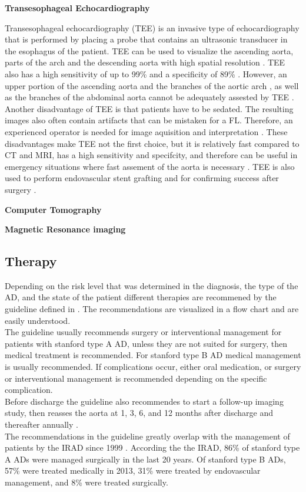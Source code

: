 \documentclass[thesis.tex]{subfiles}
\begin{document}
\textbf{Transesophageal Echocardiography}

Transesophageal echocardiography (TEE) is an invasive type of echocardiography that is performed by placing a probe that contains an ultrasonic transducer in the esophagus of the patient. TEE can be used to visualize the ascending aorta, parts of the arch and the descending aorta with high spatial resolution \cite{baliga2014role}. TEE also has a high sensitivity of up to 99\% and a specificity of 89\% \cite{baliga2014role}. However, an upper portion of the ascending aorta and the branches of the aortic arch \cite{shiga2006diagnostic,baliga2014role}, as well as the branches of the abdominal aorta cannot be adequately assested by TEE \cite{baliga2014role}. Another disadvantage of TEE is that patients have to be sedated. The resulting images also often contain artifacts that can be mistaken for a FL. Therefore, an experienced operator is needed for image aquisition and interpretation \cite{shiga2006diagnostic,baliga2014role}. These disadvantages make TEE not the first choice, but it is relatively fast compared to CT and MRI, has a high sensitivity and specifcity, and therefore can be useful in emergency situations where fast assement of the aorta is necessary \cite{shiga2006diagnostic,baliga2014role}. TEE is also used to perform endovascular stent grafting and for confirming success after surgery \cite{baliga2014role}. 

\textbf{Computer Tomography} 

\textbf{Magnetic Resonance imaging}
\subsection{Therapy} 
Depending on the risk level that was determined in the diagnosis, the type of the AD, and the state of the patient different therapies are recommened by the guideline defined in \cite{hiratzka20102010}. The recommendations are visualized in a flow chart and are easily understood. \\ The guideline usually recommends surgery or interventional management for patients with stanford type A AD, unless they are not suited for surgery, then medical treatment is recommended. For stanford type B AD medical management is usually recommended. If complications occur, either oral medication, or surgery or interventional management is recommended depending on the specific complication. \\ Before discharge the guideline also recommendes to start a follow-up imaging study, then reasses the aorta at 1, 3, 6, and 12 months after discharge and thereafter annually \cite{hiratzka20102010}. \\ The recommendations in the guideline greatly overlap with the management of patients by the IRAD since 1999 \cite{doi:10.1161/CIRCULATIONAHA.117.031264}. According the the IRAD, 86\% of stanford type A ADs were managed surgically in the last 20 years. Of stanford type B ADs, 57\% were treated medically in 2013, 31\% were treated by endovascular management, and 8\% were treated surgically. \\  
\end{document}
